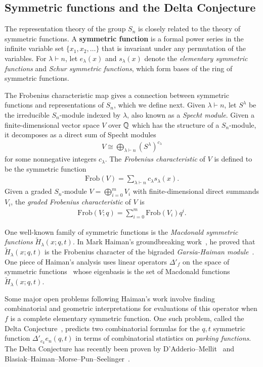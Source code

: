 \documentclass[12pt]{amsart}
\newcommand{\Frob}{\mathrm{Frob}}
\newcommand{\la}{\lambda}
\begin{document}
\subsection{Symmetric functions and the Delta Conjecture}

The representation theory of the group $S_n$ is closely related to the theory of symmetric functions.
A {\bf symmetric function} is a formal power series in the infinite variable set $\{x_1,x_2,\dots \}$ that is invariant under any permutation of the variables.
For $\la\vdash n$, let $e_\la(x)$ and $s_\la(x)$ denote the \emph{elementary symmetric functions} and \emph{Schur symmetric functions}, which form bases of the ring of symmetric functions. 

The Frobenius characteristic map gives a connection between symmetric functions and representations of $S_n$, which we define next. Given $\la\vdash n$, let $S^\la$ be the irreducible $S_n$-module indexed by $\la$, also known as a \emph{Specht module}. Given a finite-dimensional vector space $V$ over $\mathbb{Q}$ which has the structure of a $S_n$-module, it decomposes as a direct sum of Specht modules
\begin{align}
V\cong \bigoplus_{\la\vdash n}(S^\la)^{c_\la}
\end{align}
for some nonnegative integers $c_\la$. The \emph{Frobenius characteristic} of $V$ is defined to be the symmetric function
\begin{align}
\Frob(V) = \sum_{\la\vdash n} c_\la s_\la(x).
\end{align}
Given a graded $S_n$-module $V = \bigoplus_{i = 0}^m V_i$ with finite-dimensional direct summands $V_i$, the \emph{graded Frobenius characteristic} of $V$ is
\begin{align}
\Frob(V;q) = \sum_{i=0}^m \Frob(V_i)q^i.
\end{align}


One well-known family of symmetric functions is the \emph{Macdonald symmetric functions} $\widetilde H_\lambda(x;q,t)$. In Mark Haiman's groundbreaking work~\cite{Haiman01,Haiman02}, he proved that $\widetilde H_\lambda(x;q,t)$ is the Frobenius character of the bigraded \emph{Garsia-Haiman module}~\cite{Garsia-Haiman}. 
One piece of Haiman's analysis uses linear operators $\Delta'_f$ on the space of symmetric functions~\cite{BGHT} whose eigenbasis is the set of Macdonald functions $\widetilde H_\lambda(x;q,t)$. 

Some major open problems following Haiman's work involve finding combinatorial and geometric interpretations for evaluations of this operator when $f$ is a complete elementary symmetric function.
One such problem, called the Delta Conjecture~\cite{HRW}, predicts two combinatorial formulas for the $q,t$ symmetric function $\Delta'_{e_{k}}e_n(q,t)$
in terms of combinatorial statistics on \emph{parking functions}. 
The Delta Conjecture has recently been proven by D'Adderio--Mellit~\cite{DM} and Blasiak--Haiman--Morse--Pun--Seelinger~\cite{BHMPS}.
\end{document}

